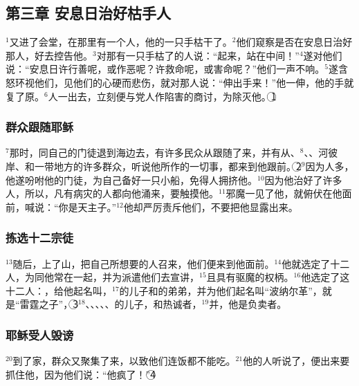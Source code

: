 \subsection{第三章 安息日治好枯手人}
$^{1}$\UL[耶稣]又进了会堂，在那里有一个人，他的一只手枯干了。$^{2}$他们窥察\UL[耶稣]是否在安息日治好那人，好去控告他。$^{3}$\UL[耶稣]对那有一只手枯了的人说：“起来，站在中间！”$^{4}$遂对他们说：“安息日许行善呢，或作恶呢？许救命呢，或害命呢？”他们一声不响。$^{5}$\UL[耶稣]遂含怒环视他们，见他们的心硬而悲伤，就对那人说：“伸出手来！”他一伸，他的手就复了原。$^{6}$\UL[法利塞]人一出去，立刻便与\UL[黑落德]党人作陷害\UL[耶稣]的商讨，为除灭他。\textcircled{1}


\subsubsection{群众跟随耶稣}
$^{7}$那时，\UL[耶稣]同自己的门徒退到海边去，有许多民众从\UL[加里肋亚]跟随了来，并有从\UL[犹太]、$^{8}$\UL[耶路撒冷]、\UL[依杜默雅]、\UL[约但]河彼岸、\UL[提洛]和\UL[漆冬]一带地方的许多群众，听说他所作的一切事，都来到他跟前。\textcircled{2}$^{9}$因为人多，他遂吩咐他的门徒，为自己备好一只小船，免得人拥挤他。$^{10}$因为他治好了许多人，所以，凡有病灾的人都向他涌来，要触摸他。$^{11}$邪魔一见了他，就俯伏在他面前，喊说：“你是天主子。”$^{12}$他却严厉责斥他们，不要把他显露出来。


\subsubsection{拣选十二宗徒}
$^{13}$随后，\UL[耶稣]上了山，把自己所想要的人召来，他们便来到他面前。$^{14}$他就选定了十二人，为同他常在一起，并为派遣他们去宣讲，$^{15}$且具有驱魔的权柄。$^{16}$他选定了这十二人：\UL[西满]，给他起名叫\UL[伯多禄]，$^{17}$\UL[载伯德]的儿子\UL[雅各伯]和\UL[雅各伯]的弟弟\UL[若望]，并为他们起名叫“波纳尔革”，就是“雷霆之子”，\textcircled{3}$^{18}$\UL[安德肋]、\UL[斐理伯]、\UL[巴尔多禄茂]、\UL[玛窦]、\UL[多默]、\UL[阿耳斐]的儿子\UL[雅各伯]，\UL[达陡]和热诚者\UL[西满]，$^{19}$并\UL[犹达斯]\UL[依斯加略]，他是负卖\UL[耶稣]者。


\subsubsection{耶稣受人毁谤}
$^{20}$\UL[耶稣]到了家，群众又聚集了来，以致他们连饭都不能吃。$^{21}$他的人听说了，便出来要抓住他，因为他们说：“他疯了！”\textcircled{4}


